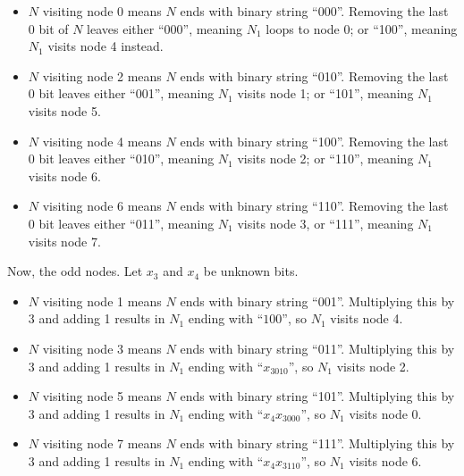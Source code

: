 \begin{itemize}
    \item $N$ visiting node 0 means $N$ ends with binary string ``000''. Removing the last 0 bit of $N$ leaves either ``000'', meaning $N_1$ loops to node 0; or ``100'', meaning $N_1$ visits node 4 instead.
    \item $N$ visiting node 2 means $N$ ends with binary string ``010''. Removing the last 0 bit leaves either ``001'', meaning $N_1$ visits node 1; or ``101'', meaning $N_1$ visits node 5.
    \item $N$ visiting node 4  means $N$ ends with binary string ``100''. Removing the last 0 bit leaves either ``010'', meaning $N_1$ visits node 2; or ``110'', meaning $N_1$ visits node 6.
    \item $N$ visiting node 6 means $N$ ends with binary string ``110''. Removing the last 0 bit leaves either ``011'',  meaning $N_1$ visits node 3, or ``111'',  meaning $N_1$ visits node 7.
\end{itemize}
Now, the odd nodes. Let $x_3$ and $x_4$ be unknown bits.
\begin{itemize}
    \item $N$ visiting node 1 means $N$ ends with binary string ``001''. Multiplying this by 3 and adding 1 results in $N_1$ ending with ``$100$'', so $N_1$ visits node 4.
    \item $N$ visiting node 3 means $N$ ends with binary string ``011''. Multiplying this by 3 and adding 1 results in $N_1$ ending with ``$x_3010$'',  so $N_1$ visits node 2.
    \item $N$ visiting node 5 means $N$ ends with binary string ``101''. Multiplying this by 3 and adding 1 results in $N_1$ ending with ``$x_4x_3000$'', so $N_1$ visits node 0.
    \item $N$ visiting node 7 means $N$ ends with binary string ``111''. Multiplying this by 3 and adding 1 results in $N_1$ ending with ``$x_4x_3110$'', so $N_1$ visits node 6.
\end{itemize}
